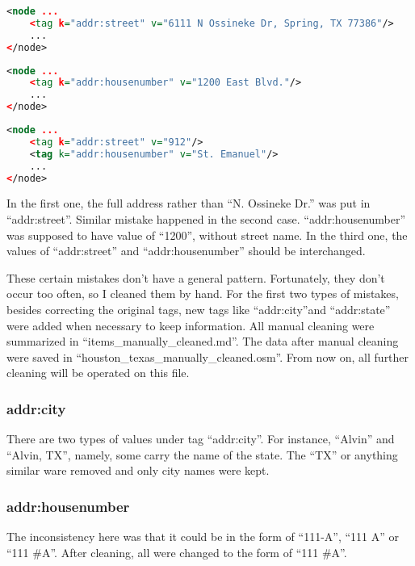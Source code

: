 \documentclass[12pt]{article}
\begin{document}
\begin{lstlisting}[language=XML,breaklines=tr, frame=single, basicstyle=\small]
<node ...
    <tag k="addr:street" v="6111 N Ossineke Dr, Spring, TX 77386"/>
    ...
</node>
\end{lstlisting}

\begin{lstlisting}[language=XML,breaklines=tr, frame=single, basicstyle=\small]
<node ...
    <tag k="addr:housenumber" v="1200 East Blvd."/>
    ...
</node>
\end{lstlisting}

\begin{lstlisting}[language=XML,breaklines=tr, frame=single, basicstyle=\small]
<node ...
    <tag k="addr:street" v="912"/>
    <tag k="addr:housenumber" v="St. Emanuel"/>
    ...
</node>
\end{lstlisting}

In the first one, the full address rather than ``N. Ossineke Dr.'' was put in ``addr:street''. Similar mistake happened in the second case. ``addr:housenumber'' was supposed to have value of ``1200'', without street name. In the third one, the values of ``addr:street'' and ``addr:housenumber'' should be interchanged.

These certain mistakes don't have a general pattern. Fortunately, they don't occur too often, so I cleaned them by hand. For the first two types of mistakes, besides correcting the original tags, new tags like ``addr:city''and ``addr:state'' were added when necessary to keep information. All manual cleaning were summarized in ``items\_manually\_cleaned.md''. The data after manual cleaning were saved in ``houston\_texas\_manually\_cleaned.osm''. From now on, all further cleaning will be operated on this file.

\subsubsection{addr:city}
There are two types of values under tag ``addr:city''. For instance, ``Alvin'' and ``Alvin, TX'', namely, some carry the name of the state. The ``TX'' or anything similar ware removed and only city names were kept.

\subsubsection{addr:housenumber}
The inconsistency here was that it could be in the form of ``111-A'', ``111 A'' or ``111 \#A''. After cleaning, all were changed to the form of ``111 \#A''.
\end{document}
